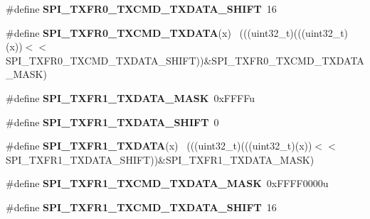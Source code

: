 \begin{DoxyCompactItemize}
\item 
\hypertarget{group___s_p_i___register___masks_gad5b1e75e9410e41d3c81384798040284}{}\#define {\bfseries S\+P\+I\+\_\+\+T\+X\+F\+R0\+\_\+\+T\+X\+C\+M\+D\+\_\+\+T\+X\+D\+A\+T\+A\+\_\+\+S\+H\+I\+F\+T}~16\label{group___s_p_i___register___masks_gad5b1e75e9410e41d3c81384798040284}

\item 
\hypertarget{group___s_p_i___register___masks_ga7c7be145ccd1decbb6a6e5d60b8e43e5}{}\#define {\bfseries S\+P\+I\+\_\+\+T\+X\+F\+R0\+\_\+\+T\+X\+C\+M\+D\+\_\+\+T\+X\+D\+A\+T\+A}(x)                            ~(((uint32\+\_\+t)(((uint32\+\_\+t)(x))$<$$<$S\+P\+I\+\_\+\+T\+X\+F\+R0\+\_\+\+T\+X\+C\+M\+D\+\_\+\+T\+X\+D\+A\+T\+A\+\_\+\+S\+H\+I\+F\+T))\&S\+P\+I\+\_\+\+T\+X\+F\+R0\+\_\+\+T\+X\+C\+M\+D\+\_\+\+T\+X\+D\+A\+T\+A\+\_\+\+M\+A\+S\+K)\label{group___s_p_i___register___masks_ga7c7be145ccd1decbb6a6e5d60b8e43e5}

\item 
\hypertarget{group___s_p_i___register___masks_ga1264b5c9bd3d50782925741457405b2d}{}\#define {\bfseries S\+P\+I\+\_\+\+T\+X\+F\+R1\+\_\+\+T\+X\+D\+A\+T\+A\+\_\+\+M\+A\+S\+K}~0x\+F\+F\+F\+Fu\label{group___s_p_i___register___masks_ga1264b5c9bd3d50782925741457405b2d}

\item 
\hypertarget{group___s_p_i___register___masks_ga15dd2d0a8568bc36fed73be8a4cb24a0}{}\#define {\bfseries S\+P\+I\+\_\+\+T\+X\+F\+R1\+\_\+\+T\+X\+D\+A\+T\+A\+\_\+\+S\+H\+I\+F\+T}~0\label{group___s_p_i___register___masks_ga15dd2d0a8568bc36fed73be8a4cb24a0}

\item 
\hypertarget{group___s_p_i___register___masks_gabd7e322bf2ad97cf8ec496b73050be6c}{}\#define {\bfseries S\+P\+I\+\_\+\+T\+X\+F\+R1\+\_\+\+T\+X\+D\+A\+T\+A}(x)                                        ~(((uint32\+\_\+t)(((uint32\+\_\+t)(x))$<$$<$S\+P\+I\+\_\+\+T\+X\+F\+R1\+\_\+\+T\+X\+D\+A\+T\+A\+\_\+\+S\+H\+I\+F\+T))\&S\+P\+I\+\_\+\+T\+X\+F\+R1\+\_\+\+T\+X\+D\+A\+T\+A\+\_\+\+M\+A\+S\+K)\label{group___s_p_i___register___masks_gabd7e322bf2ad97cf8ec496b73050be6c}

\item 
\hypertarget{group___s_p_i___register___masks_ga03437d9c36165cd76cc1b649bc61fdcd}{}\#define {\bfseries S\+P\+I\+\_\+\+T\+X\+F\+R1\+\_\+\+T\+X\+C\+M\+D\+\_\+\+T\+X\+D\+A\+T\+A\+\_\+\+M\+A\+S\+K}~0x\+F\+F\+F\+F0000u\label{group___s_p_i___register___masks_ga03437d9c36165cd76cc1b649bc61fdcd}

\item 
\hypertarget{group___s_p_i___register___masks_ga0240ff4345642a5bca2308c670c5a980}{}\#define {\bfseries S\+P\+I\+\_\+\+T\+X\+F\+R1\+\_\+\+T\+X\+C\+M\+D\+\_\+\+T\+X\+D\+A\+T\+A\+\_\+\+S\+H\+I\+F\+T}~16\label{group___s_p_i___register___masks_ga0240ff4345642a5bca2308c670c5a980}


\end{DoxyCompactItemize}
